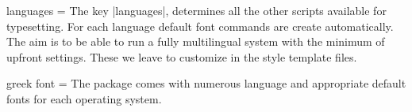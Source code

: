 \begin{docKey}{languages}{ = }  {}
The key |languages|, determines all the other scripts available for typesetting. For each language default font commands are create automatically. The aim is to be able to run a fully multilingual system with the minimum of upfront settings. These we leave to customize in the style template files.
\end{docKey}

\begin{docKey}{greek font}{ = }  {}
The package comes with numerous language and appropriate default fonts
for each operating system. 
\end{docKey}












